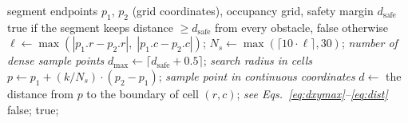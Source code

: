 \documentclass[lettersize,journal]{IEEEtran}
\begin{document}
\begin{algorithm}[!t]
\caption{IsLineFree }
\label{alg:islinefree}
\begin{algorithmic}[1]
\REQUIRE segment endpoints $p_1$, $p_2$ (grid coordinates), occupancy grid, safety margin $d_{\mathrm{safe}}$
\ENSURE true if the segment keeps distance $\geq d_{\mathrm{safe}}$ from every obstacle, false otherwise
\STATE $\ell \gets \max(|p_1.r - p_2.r|,\; |p_1.c - p_2.c|)$;
\STATE $N_s \gets \max(\lceil 10 \cdot \ell \rceil, 30)$; \quad\textit{number of dense sample points}
\STATE $d_{\max} \gets \lceil d_{\mathrm{safe}} + 0.5 \rceil$; \quad\textit{search radius in cells}
\STATE $p \gets p_1 + (k / N_s) \cdot (p_2 - p_1)$; \quad\textit{sample point in continuous coordinates}
\STATE $d \gets$ the distance from $p$ to the boundary of cell $(r, c)$; \quad\textit{see Eqs.~\textcolor{blue}{\eqref{eq:dxymax}}--\textcolor{blue}{\eqref{eq:dist}}}
\STATE \RETURN false;
\ENDIF
\ENDIF
\ENDFOR
\ENDFOR
\STATE \RETURN true;
\end{algorithmic}
\end{algorithm}
\end{document}
